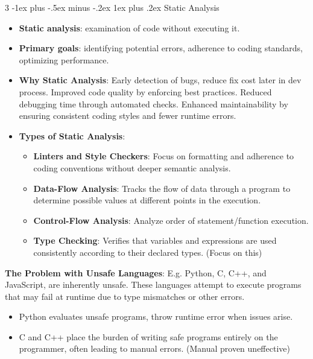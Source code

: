 \documentclass[a4paper, 10pt, landscape]{article}
\makeatletter
\renewcommand{\subsubsection}{\@startsection{subsubsection}{3}{0mm}%
                                {-1ex plus -.5ex minus -.2ex}%
                                {1ex plus .2ex}%
                                {\normalfont\small\bfseries}}
\makeatother
\begin{document}
\begin{multicols*}{3}
\subsubsection{Static Analysis}
\begin{itemize}
\item \textbf{Static analysis}: examination of code without executing it. 
\item \textbf{Primary goals}: identifying potential errors, adherence to coding standards, optimizing performance.
\item \textbf{Why Static Analysis}: Early detection of bugs, reduce fix cost later in dev process. Improved code quality by enforcing best practices.
	Reduced debugging time through automated checks. Enhanced maintainability by ensuring consistent coding styles and fewer runtime errors.
\item \textbf{Types of Static Analysis}:
	\begin{itemize}
	\item \textbf{Linters and Style Checkers}: Focus on formatting and adherence to coding conventions without deeper semantic analysis.
	\item \textbf{Data-Flow Analysis}: Tracks the flow of data through a program to determine possible values at different points in the execution.
	\item \textbf{Control-Flow Analysis}: Analyze order of statement/function execution.
	\item \textbf{Type Checking}: Verifies that variables and expressions are used consistently according to their declared types. (Focus on this)
	\end{itemize}
\end{itemize}

\textbf{The Problem with Unsafe Languages}: E.g. Python, C, C++, and JavaScript, are inherently unsafe. These languages attempt to execute programs that may fail at runtime due to type mismatches or other errors.
\begin{itemize}
\item Python evaluates unsafe programs, throw runtime error when issues arise.
\item C and C++ place the burden of writing safe programs entirely on the programmer, often leading to manual errors. (Manual proven uneffective)
\end{itemize}



\end{multicols*}
\end{document}
